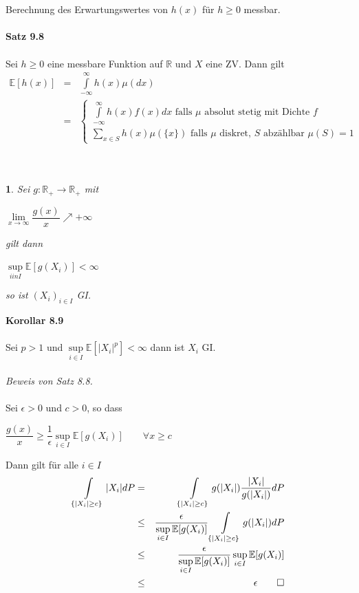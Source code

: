 \documentclass[10pt,a4paper]{report}
\newcommand{\E}{\mathbb{E}}
\newcommand{\R}{\mathbb{R}}
\numberwithin{equation}{section}
\numberwithin{figure}{section}
\theoremstyle{plain}
\theoremstyle{definition}
\theoremstyle{plain}
\newtheorem{prop}{\protect\propositionname}[section]
\theoremstyle{definition}
\theoremstyle{remark}
\theoremstyle{plain}
\theoremstyle{plain}
\theoremstyle{plain}
\theoremstyle{plain}
\theoremstyle{plain}
\providecommand{\propositionname}{Satz}
\newcommand{\1}{ \mathbb{1} } %
\begin{document}
$ $\\\\
Berechnung des Erwartungswertes von $h(x)$ für $h \geq 0$ messbar.\\\\
\textbf{Satz 9.8}\\\\
Sei $h\geq 0$ eine messbare Funktion auf $\R$ und $X$ eine ZV. Dann gilt
\begin{eqnarray*}
\E[h(x)] &=& \int\limits_{-\infty}^{\infty} h(x) \mu(dx)\\
&=& \begin{cases}
\int\limits_{-\infty}^\infty h(x)f(x) dx \text{ falls } \mu \text{ absolut stetig mit Dichte } f\\
\sum\limits_{x \in S} h(x)\mu(\{x\}) \text{ falls } \mu \text{ diskret, } S \text{ abzählbar } \mu(S)=1
\end{cases}
\end{eqnarray*}
\\\\
\begin{prop}
  Sei $g:\R_+ \to \R_+$ mit
  \begin{center}
    $\lim\limits_{x\to \infty} \dfrac{g(x)}{x}\nearrow +\infty$
  \end{center}
  gilt dann
  \begin{center}
    $\sup\limits_{i in I} \E[g(X_i)]<\infty$
  \end{center}
  so ist $(X_i)_{i \in I}$ GI.
\end{prop}
\textbf{Korollar 8.9}\\\\
Sei $p>1$ und $\sup\limits_{i \in I}\E[|X_i|^p]<\infty$ dann ist $X_i$ GI.\\\\
\textit{Beweis von Satz 8.8.}\\\\
Sei $\epsilon > 0$ und $c>0$, so dass 
\begin{center}
$\dfrac{g(x)}{x}\geq \dfrac{1}{\epsilon} \sup\limits_{i \in I}\E[g(X_i)] \qquad \forall x \geq c$
\end{center}
Dann gilt für alle $i \in I$
\begin{eqnarray*}
\int\limits_{\{|X_i|\geq c\}} |X_i|dP &=& \int\limits_{\{|X_i|\geq c\}} g(|X_i|)\dfrac{|X_i|}{g(|X_i|)} dP\\
&\leq &\dfrac{\epsilon}{\sup\limits_{i \in I}\E[g(X_i)]}\int\limits_{\{|X_i|\geq c\}} g(|X_i|)dP\\
&\leq & \dfrac{\epsilon}{\sup\limits_{i \in I}\E[g(X_i)]}\sup\limits_{i \in I}\E[g(X_i)]\\
&\leq & \epsilon \qed
\end{eqnarray*}
\end{document}
